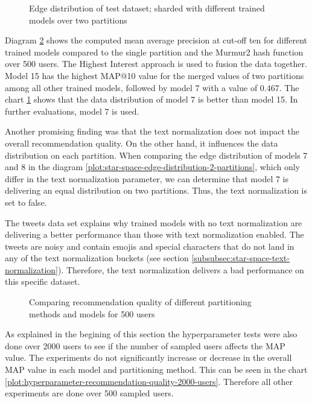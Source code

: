 \begin{figure}[!h]
    \centering
    
    \caption{Edge distribution of test dataset; sharded with different trained models over two partitions}
    \label{plot:edge-distribution}
\end{figure}


Diagram \ref{plot:hyperparameter-recommendation-quality} shows the computed mean average precision at cut-off ten for different trained models compared to the single partition and the Murmur2 hash function over 500 users. The Highest Interest approach is used to fusion the data together. Model 15 has the highest MAP@10 value for the merged values of two partitions among all other trained models, followed by model 7 with a value of 0.467. The chart \ref{plot:edge-distribution} shows that the data distribution of model 7 is better than model 15. In further evaluations, model 7 is used.


Another promising finding was that the text normalization does not impact the overall recommendation quality. On the other hand, it influences the data distribution on each partition. When comparing the edge distribution of models 7 and 8 in the diagram \ref{plot:star-space-edge-distribution-2-partitions}, which only differ in the text normalization parameter, we can determine that model 7 is delivering an equal distribution on two partitions. Thus, the text normalization is set to false. 


The tweets data set explains why trained models with no text normalization are delivering a better performance than those with text normalization enabled. The tweets are noisy and contain emojis and special characters that do not land in any of the text normalization buckets (see section \ref{subsubsec:star-space-text-normalization}). Therefore, the text normalization delivers a bad performance on this specific dataset.

\begin{figure}[!h]
    \centering
    
    \caption{Comparing recommendation quality of different partitioning methods and models for 500 users}
    \label{plot:hyperparameter-recommendation-quality}
\end{figure}


As explained in the begining of this section the hyperparameter tests were also done over 2000 users to see if the number of sampled users affects the MAP value. The experiments do not significantly increase or decrease in the overall MAP value in each model and partitioning method. This can be seen in the chart \ref{plot:hyperparameter-recommendation-quality-2000-users}. Therefore all other experiments are done over 500 sampled users.


